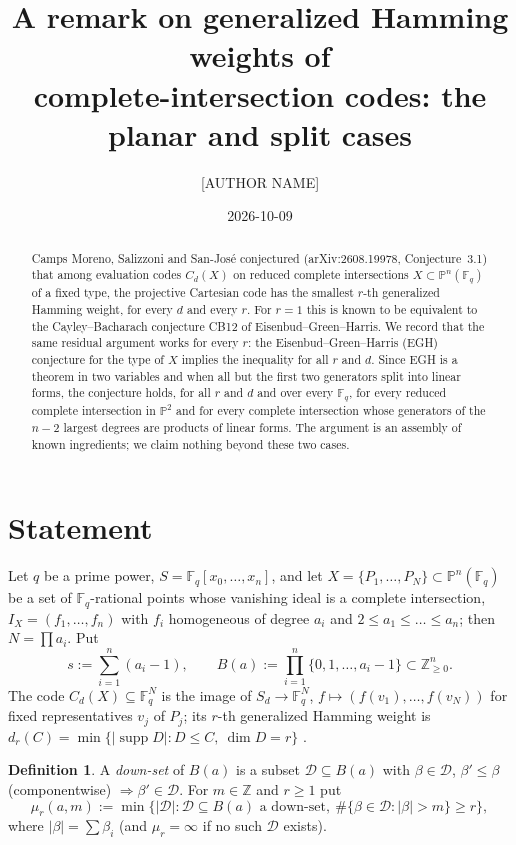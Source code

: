 \documentclass[11pt]{amsart}
\title[Generalized Hamming weights of complete-intersection codes]{A remark on generalized Hamming weights of\\ complete-intersection codes: the planar and split cases}
\author{[AUTHOR NAME]}
\date{2026-10-09}
\theoremstyle{remark}
\theoremstyle{definition}
\newtheorem{definition}[theorem]{Definition}
\newcommand{\F}{\mathbb F}
\begin{document}
\begin{abstract}
Camps Moreno, Salizzoni and San-Jos\'e conjectured (arXiv:2608.19978, Conjecture~3.1) that among
evaluation codes $C_d(X)$ on reduced complete intersections $X\subset\mathbb P^n(\F_q)$ of a fixed
type, the projective Cartesian code has the smallest $r$-th generalized Hamming weight, for every $d$
and every $r$. For $r=1$ this is known to be equivalent to the Cayley--Bacharach conjecture CB12 of
Eisenbud--Green--Harris. We record that the same residual argument works for every $r$: the
Eisenbud--Green--Harris (EGH) conjecture for the type of $X$ implies the inequality for all $r$ and
$d$. Since EGH is a theorem in two variables and when all but the first two generators split into
linear forms, the conjecture holds, for all $r$ and $d$ and over every $\F_q$, for every reduced
complete intersection in $\mathbb P^2$ and for every complete intersection whose generators of the
$n-2$ largest degrees are products of linear forms. The argument is an assembly of known
ingredients; we claim nothing beyond these two cases.
\end{abstract}
\maketitle

\section{Statement}

Let $q$ be a prime power, $S=\F_q[x_0,\dots,x_n]$, and let $X=\{P_1,\dots,P_N\}\subset\mathbb P^n(\F_q)$
be a set of $\F_q$-rational points whose vanishing ideal is a complete intersection,
$I_X=(f_1,\dots,f_n)$ with $f_i$ homogeneous of degree $a_i$ and $2\le a_1\le\dots\le a_n$; then
$N=\prod a_i$. Put
\[
 s:=\sum_{i=1}^n (a_i-1),\qquad B(a):=\prod_{i=1}^n\{0,1,\dots,a_i-1\}\subset\mathbb Z_{\ge0}^n .
\]
The code $C_d(X)\subseteq\F_q^N$ is the image of $S_d\to\F_q^N$, $f\mapsto (f(v_1),\dots,f(v_N))$ for
fixed representatives $v_j$ of $P_j$; its $r$-th generalized Hamming weight is
$d_r(C)=\min\{|\operatorname{supp}D|: D\le C,\ \dim D=r\}$ \cite{Wei}.

\begin{definition}
A \emph{down-set} of $B(a)$ is a subset $\mathcal D\subseteq B(a)$ with $\beta\in\mathcal D$, $\beta'\le\beta$
(componentwise) $\Rightarrow \beta'\in\mathcal D$. For $m\in\mathbb Z$ and $r\ge1$ put
\[
 \mu_r(a,m):=\min\bigl\{|\mathcal D| : \mathcal D\subseteq B(a)\text{ a down-set},\ \#\{\beta\in\mathcal D:|\beta|>m\}\ge r\bigr\},
\]
where $|\beta|=\sum\beta_i$ (and $\mu_r=\infty$ if no such $\mathcal D$ exists).
\end{definition}
\end{document}
